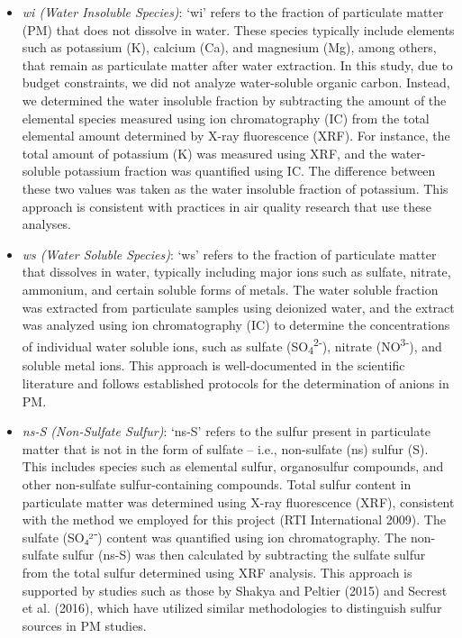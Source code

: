 \documentclass[
  letterpaper,
  DIV=11,
  numbers=noendperiod]{scrartcl}
\begin{document}
\begin{itemize}
\item
  \emph{wi (Water Insoluble Species)}: `wi' refers to the fraction of
  particulate matter (PM) that does not dissolve in water. These species
  typically include elements such as potassium (K), calcium (Ca), and
  magnesium (Mg), among others, that remain as particulate matter after
  water extraction. In this study, due to budget constraints, we did not
  analyze water-soluble organic carbon. Instead, we determined the water
  insoluble fraction by subtracting the amount of the elemental species
  measured using ion chromatography (IC) from the total elemental amount
  determined by X-ray fluorescence (XRF). For instance, the total amount
  of potassium (K) was measured using XRF, and the water-soluble
  potassium fraction was quantified using IC. The difference between
  these two values was taken as the water insoluble fraction of
  potassium. This approach is consistent with practices in air quality
  research that use these analyses.
\item
  \emph{ws (Water Soluble Species)}: `ws'  refers to the
  fraction of particulate matter that dissolves in water, typically
  including major ions such as sulfate, nitrate, ammonium, and certain
  soluble forms of metals. The water soluble fraction was extracted from
  particulate samples using deionized water, and the extract was
  analyzed using ion chromatography (IC) to determine the concentrations
  of individual water soluble ions, such as sulfate
  (SO\textsubscript{4}\textsuperscript{2-}), nitrate
  (NO\textsuperscript{3-}), and soluble metal ions. This approach is
  well-documented in the scientific literature and follows established
  protocols for the determination of anions in PM.
\item
  \emph{ns-S (Non-Sulfate Sulfur)}: `ns-S' refers to the sulfur present
  in particulate matter that is not in the form of sulfate -- i.e.,
  non-sulfate (ns) sulfur (S). This includes species such as elemental
  sulfur, organosulfur compounds, and other non-sulfate
  sulfur-containing compounds. Total sulfur content in particulate
  matter was determined using X-ray fluorescence (XRF), consistent with
  the method we employed for this project (RTI International 2009). The
  sulfate (SO₄²⁻) content was quantified using ion chromatography. The
  non-sulfate sulfur (ns-S) was then calculated by subtracting the
  sulfate sulfur from the total sulfur determined using XRF analysis.
  This approach is supported by studies such as those by Shakya and
  Peltier (2015) and Secrest et al. (2016), which have utilized similar
  methodologies to distinguish sulfur sources in PM studies.
\end{itemize}
\end{document}

